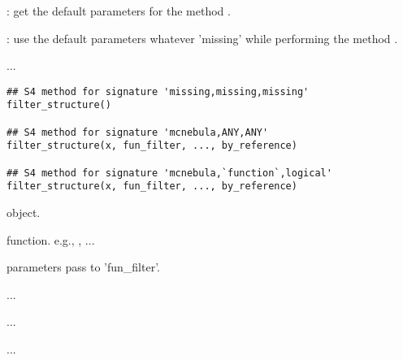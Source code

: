 \documentclass[letterpaper]{book}
\begin{document}
%
\begin{Description}\relax
{}: get the default parameters for the method
.

: use the default parameters whatever 'missing'
while performing the method .

...
\end{Description}
%
\begin{Usage}
\begin{verbatim}
## S4 method for signature 'missing,missing,missing'
filter_structure()

## S4 method for signature 'mcnebula,ANY,ANY'
filter_structure(x, fun_filter, ..., by_reference)

## S4 method for signature 'mcnebula,`function`,logical'
filter_structure(x, fun_filter, ..., by_reference)
\end{verbatim}
\end{Usage}
%
\begin{Arguments}
\begin{ldescription}
\item[\code{x}]  object.

\item[\code{fun\_filter}] function. e.g., ,  ...

\item[\code{...}] parameters pass to 'fun\_filter'.

\item[\code{by\_reference}] ...
\end{ldescription}
\end{Arguments}
%
\begin{Details}\relax
...
\end{Details}
%
\begin{Value}
...
\end{Value}
%
\begin{SeeAlso}\relax
{}
\end{SeeAlso}
\end{document}

